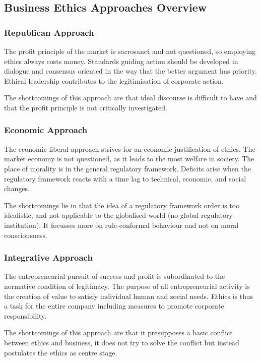 \documentclass[11pt]{article}
\theoremstyle{definition}
\begin{document}
\subsection{Business Ethics Approaches Overview}
\subsubsection{Republican Approach}
The profit principle of the market is sacrosanct and not questioned, so employing ethics always costs money. Standards guiding action should be developed in dialogue and consensus oriented in the way that the better argument has priority. Ethical leadership contributes to the legitimisation of corporate action.

The shortcomings of this approach are that ideal discourse is difficult to have and that the profit principle is not critically investigated.

\subsubsection{Economic Approach}
The economic liberal approach strives for an economic justification of ethics. The market economy is not questioned, as it leads to the most welfare in society. The place of morality is in the general regulatory framework. Deficits arise when the regulatory framework reacts with a time lag to technical, economic, and social changes.

The shortcomings lie in that the idea of a regulatory framework order is too idealistic, and not applicable to the globalised world (no global regulatory institution). It focusses more on rule-conformal behaviour and not on moral consciousness.

\subsubsection{Integrative Approach}
The entrepreneurial pursuit of success and profit is subordinated to the normative condition of legitimacy. The purpose of all entrepreneurial activity is the creation of value to satisfy individual human and social needs. Ethics is thus a task for the entire company including measures to promote corporate responsibility.

The shortcomings of this approach are that it presupposes a basic conflict between ethics and business, it does not try to solve the conflict but instead postulates the ethics as centre stage.
\end{document}
